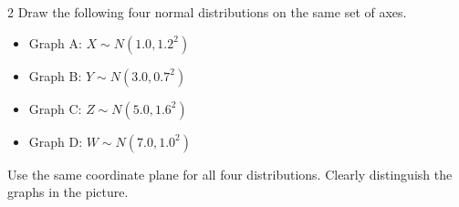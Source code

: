 \begin{multicols}{2}
\vspace{-0.25cm}
Draw the following four normal distributions on the same set of axes.
\begin{itemize}
\item Graph A: $X\sim N(1.0,1.2^2)$
\item Graph B: $Y\sim N(3.0,0.7^2)$
\item Graph C: $Z\sim N(5.0,1.6^2)$
\item Graph D: $W\sim N(7.0,1.0^2)$
\end{itemize}
Use the same coordinate plane for all four distributions. Clearly distinguish the graphs in the picture.

\end{multicols}



